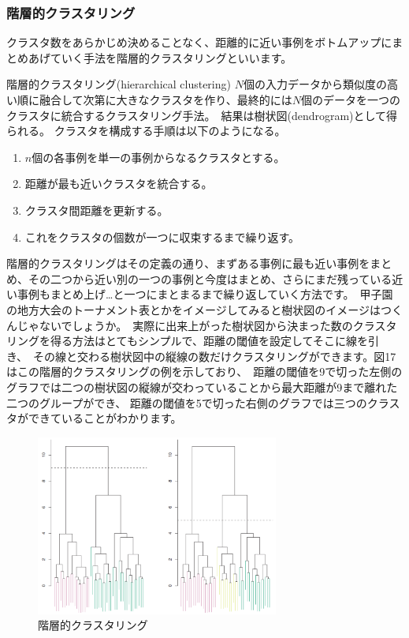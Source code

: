 \documentclass[uplatex]{jsarticle}
\begin{document}
\subsubsection{階層的クラスタリング}
クラスタ数をあらかじめ決めることなく、距離的に近い事例をボトムアップにまとめあげていく手法を階層的クラスタリングといいます。
\begin{itembox}[l]{階層的クラスタリング(hierarchical clustering)}
  $N$個の入力データから類似度の高い順に融合して次第に大きなクラスタを作り、最終的には$N$個のデータを一つのクラスタに統合するクラスタリング手法。\
  結果は樹状図(dendrogram)として得られる。
  クラスタを構成する手順は以下のようになる。
   \begin{enumerate}
     \item $n$個の各事例を単一の事例からなるクラスタとする。
     \item 距離が最も近いクラスタを統合する。
     \item クラスタ間距離を更新する。
     \item これをクラスタの個数が一つに収束するまで繰り返す。
   \end{enumerate}
\end{itembox}
階層的クラスタリングはその定義の通り、まずある事例に最も近い事例をまとめ、その二つから近い別の一つの事例と今度はまとめ、さらにまだ残っている近い事例もまとめ上げ…と一つにまとまるまで繰り返していく方法です。\
甲子園の地方大会のトーナメント表とかをイメージしてみると樹状図のイメージはつくんじゃないでしょうか。\
実際に出来上がった樹状図から決まった数のクラスタリングを得る方法はとてもシンプルで、距離の閾値を設定してそこに線を引き、\
その線と交わる樹状図中の縦線の数だけクラスタリングができます。図17はこの階層的クラスタリングの例を示しており、\
距離の閾値を9で切った左側のグラフでは二つの樹状図の縦線が交わっていることから最大距離が9まで離れた二つのグループができ、
距離の閾値を5で切った右側のグラフでは三つのクラスタができていることがわかります。
\begin{figure}
  \begin{center}
    \includegraphics[width=8cm]{img/cllustering.png}
    \caption{階層的クラスタリング}
  \end{center}
\end{figure}
\end{document}

